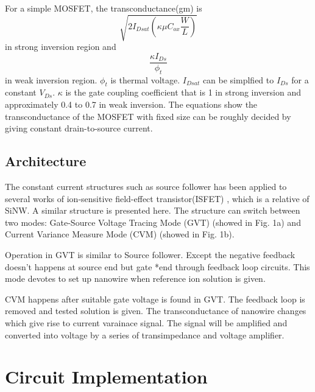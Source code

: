 \documentclass{article}
\begin{document}
For a simple MOSFET, the transconductance(gm) is
\begin{equation}
    \sqrt{2I_{Dsat} (\kappa \mu C_{ox} \frac{W}{L})}
\end{equation}
in strong inversion region and
\begin{equation}
    \frac{\kappa I_{Ds}}{\phi_t}
\end{equation}
in weak inversion region. $\phi_t$ is thermal voltage.
$I_{Dsat}$ can be simplfied to $I_{Ds}$ for a constant $V_{Ds}$.
$\kappa$ is the gate coupling coefficient that is 1 in strong inversion and approximately 0.4 to 0.7 in weak inversion.
The equations show the transconductance of the MOSFET with fixed size can be roughly decided by giving constant drain-to-source current.

\subsection{Architecture}
The constant current structures such as source follower has been applied to several works of ion-sensitive field-effect transistor(ISFET) \cite{J6,C7}, which is a relative of SiNW.
A similar structure is presented here. The structure can switch between two modes: Gate-Source Voltage Tracing Mode (GVT) (showed in Fig. 1a) and Current Variance Measure Mode (CVM) (showed in Fig. 1b).

Operation in GVT is similar to Source follower.
Except the negative feedback doesn’t happens at source end but gate *end through feedback loop circuits.
This mode devotes to set up nanowire when reference ion solution is given.

CVM happens after suitable gate voltage is found in GVT.
The feedback loop is removed and tested solution is given.
The transconductance of nanowire changes which give rise to current varainace signal.
The signal will be amplified and converted into voltage by a series of transimpedance and voltage amplifier.

\section{Circuit Implementation}




%
%
%
%
\end{document}
